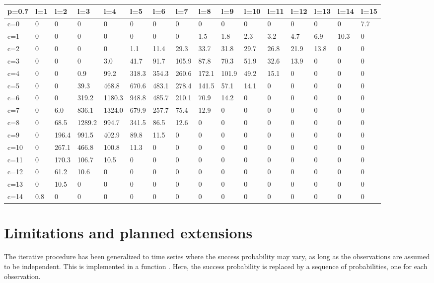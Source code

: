 \tiny{
\begin{tabular}{l | l l l l l l l l l l l l l l l}
\hline
p=0.7&l=1&l=2&l=3&l=4&l=5&l=6&l=7&l=8&l=9&l=10&l=11&l=12&l=13&l=14&l=15\\
\hline
c=0&0&0&0&0&0&0&0&0&0&0&0&0&0&0&7.7\\
c=1&0&0&0&0&0&0&0&1.5&1.8&2.3&3.2&4.7&6.9&10.3&0\\
c=2&0&0&0&0&1.1&11.4&29.3&33.7&31.8&29.7&26.8&21.9&13.8&0&0\\
c=3&0&0&0&3.0&41.7&91.7&105.9&87.8&70.3&51.9&32.6&13.9&0&0&0\\
c=4&0&0&0.9&99.2&318.3&354.3&260.6&172.1&101.9&49.2&15.1&0&0&0&0\\
c=5&0&0&39.3&468.8&670.6&483.1&278.4&141.5&57.1&14.1&0&0&0&0&0\\
c=6&0&0&319.2&1180.3&948.8&485.7&210.1&70.9&14.2&0&0&0&0&0&0\\
c=7&0&6.0&836.1&1324.0&679.9&257.7&75.4&12.9&0&0&0&0&0&0&0\\
c=8&0&68.5&1289.2&994.7&341.5&86.5&12.6&0&0&0&0&0&0&0&0\\
c=9&0&196.4&991.5&402.9&89.8&11.5&0&0&0&0&0&0&0&0&0\\
c=10&0&267.1&466.8&100.8&11.3&0&0&0&0&0&0&0&0&0&0\\
c=11&0&170.3&106.7&10.5&0&0&0&0&0&0&0&0&0&0&0\\
c=12&0&61.2&10.6&0&0&0&0&0&0&0&0&0&0&0&0\\
c=13&0&10.5&0&0&0&0&0&0&0&0&0&0&0&0&0\\
c=14&0.8&0&0&0&0&0&0&0&0&0&0&0&0&0&0\\
\hline
\end{tabular}
}

\normalsize

\section{Limitations and planned extensions}

The iterative procedure has been generalized to time series where the success probability may vary, as long as the observations are assumed to be independent. This is implemented in a function . Here, the success probability is replaced by a sequence of probabilities, one for each observation.

